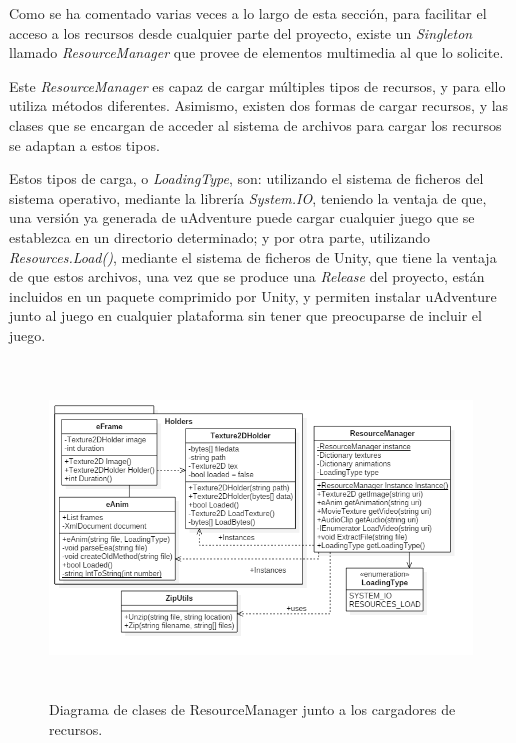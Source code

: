 Como se ha comentado varias veces a lo largo de esta sección, para facilitar el acceso a los recursos desde cualquier parte del proyecto, existe un \textit{Singleton} llamado \textit{ResourceManager} que provee de elementos multimedia al que lo solicite.

Este \textit{ResourceManager} es capaz de cargar múltiples tipos de recursos, y para ello utiliza métodos diferentes. Asimismo, existen dos formas de cargar recursos, y las clases que se encargan de acceder al sistema de archivos para cargar los recursos se adaptan a estos tipos.

Estos tipos de carga, o \textit{LoadingType}, son: utilizando el sistema de ficheros del sistema operativo, mediante la librería \textit{System.IO}, teniendo la ventaja de que, una versión ya generada de uAdventure puede cargar cualquier juego que se establezca en un directorio determinado; y por otra parte, utilizando \textit{Resources.Load()}, mediante el sistema de ficheros de Unity, que tiene la ventaja de que estos archivos, una vez que se produce una \textit{Release} del proyecto, están incluidos en un paquete comprimido por Unity, y permiten instalar uAdventure junto al juego en cualquier plataforma sin tener que preocuparse de incluir el juego.

\begin{figure}[h!]
	\centerline{\includegraphics[height=3.5in]{figures/it2/ResourceManager.png}}
	\caption[ResourceManager - Versión Final]{Diagrama de clases de ResourceManager junto a los cargadores de recursos.}
	\label{resourcemanagerit2}
\end{figure}

